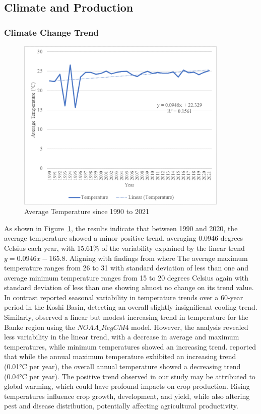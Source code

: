 \subsection{Climate and Production}

\subsubsection{Climate Change Trend}
\begin{figure}[H]
    \centering
    \caption{Average Temperature since 1990 to 2021} 
    \label{fig:trend_avg_temp}
    \includegraphics[width=0.9\textwidth]{images/trend_avg_temp.png}
\end{figure}

As shown in Figure~\ref{fig:trend_avg_temp}, the results indicate that between 1990 and 2020, the average temperature showed a minor positive trend, averaging 0.0946 degrees Celsius each year, with 15.61\% of the variability explained by the linear trend \( y = 0.0946x -165.8 \). Aligning with findings from \textcite{regmiCROPYIELDRESPONSE2019} where  The average maximum temperature ranges from 26 to 31 with standard deviation of less than one and average minimum temperature ranges from 15 to 20 degrees Celsius again with standard deviation of less than one showing almost no change on its trend value. In contrast  \textcite{puriSpatialTemporalVariations2024} reported seasonal variability in temperature trends over a 60-year period in the Koshi Basin, detecting an overall slightly insignificant cooling trend. Similarly, \textcite{risalImpactClimateChange2022} observed a linear but modest increasing trend in temperature for the Banke region using the $NOAA\_RegCM4$ model. However, the analysis revealed less variability in the linear trend, with a decrease in average and maximum temperatures, while minimum temperatures showed an increasing trend. \textcite{dawadiImpactClimateChange2022} reported that while the annual maximum temperature exhibited an increasing trend (0.01°C per year), the overall annual temperature showed a decreasing trend (0.04°C per year).
The positive trend observed in our study may be attributed to global warming, which could have profound impacts on crop production. Rising temperatures influence crop growth, development, and yield, while also altering pest and disease distribution, potentially affecting agricultural productivity.

